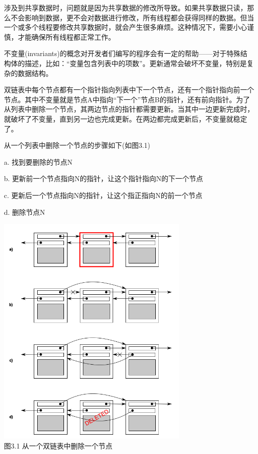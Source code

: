 
涉及到共享数据时，问题就是因为共享数据的修改所导致。如果共享数据只读，那么不会影响到数据，更不会对数据进行修改，所有线程都会获得同样的数据。但当一个或多个线程要修改共享数据时，就会产生很多麻烦。这种情况下，需要小心谨慎，才能确保所有线程都正常工作。

不变量(invariants)的概念对开发者们编写的程序会有一定的帮助——对于特殊结构体的描述，比如：“变量包含列表中的项数”。更新通常会破坏不变量，特别是复杂的数据结构。

双链表中每个节点都有一个指针指向列表中下一个节点，还有一个指针指向前一个节点。其中不变量就是节点A中指向“下一个”节点B的指针，还有前向指针。为了从列表中删除一个节点，其两边节点的指针都需要更新。当其中一边更新完成时，就破坏了不变量，直到另一边也完成更新。在两边都完成更新后，不变量就稳定了。

从一个列表中删除一个节点的步骤如下(如图3.1)

   a. 找到要删除的节点N

   b. 更新前一个节点指向N的指针，让这个指针指向N的下一个节点

   c. 更新后一个节点指向N的指针，让这个指正指向N的前一个节点

   d. 删除节点N

\begin{center}
    \includegraphics[width=0.7\textwidth]{content/chapter03/images/3-1.png}\\
    图3.1 从一个双链表中删除一个节点
\end{center}


